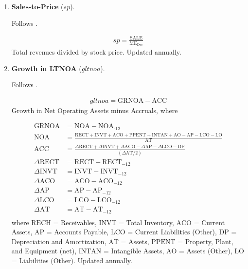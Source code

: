\begin{enumerate}
	
	
	\item \textbf{Sales-to-Price} ($sp$).
	
	
	Follows . 
	
	\begin{align*}
		sp =\frac{ \mathrm{SALE} }{ \mathrm{ME}_{\text{Dec}} }
	\end{align*}
	Total revenues divided by stock price. Updated annually.
	
	
	
	\item \textbf{Growth in LTNOA} ($gltnoa$). 
	
	Follows . 
	
	\begin{align*}
		gltnoa = \mathrm{GRNOA} - \mathrm{ACC}
	\end{align*}
	Growth in Net Operating Assets minus Accruals, where 
	
	\begin{align*}
		\mathrm{GRNOA} &= \mathrm{NOA} - \mathrm{NOA}_{\text{-12}} \\
		\mathrm{NOA} &= \frac{ \mathrm{RECT} + \mathrm{INVT} + \mathrm{ACO} + \mathrm{PPENT} + \mathrm{INTAN} + \mathrm{AO} - \mathrm{AP} - \mathrm{LCO} - \mathrm{LO} }{ \mathrm{AT} } \\
		\mathrm{ACC} &= \frac{ \Delta\mathrm{RECT} + \Delta\mathrm{INVT} + \Delta\mathrm{ACO} - \Delta\mathrm{AP} - \Delta\mathrm{LCO} - \mathrm{DP} }{ \left( \Delta\mathrm{AT} / 2 \right) } \\
		\Delta\mathrm{RECT} &= \mathrm{RECT} - \mathrm{RECT}_{-12} \\
		\Delta\mathrm{INVT} &= \mathrm{INVT} - \mathrm{INVT}_{-12} \\
		\Delta\mathrm{ACO} &= \mathrm{ACO} - \mathrm{ACO}_{-12} \\
		\Delta\mathrm{AP} &= \mathrm{AP} - \mathrm{AP}_{-12} \\
		\Delta\mathrm{LCO} &= \mathrm{LCO} - \mathrm{LCO}_{-12} \\
		\Delta\mathrm{AT} &= \mathrm{AT} - \mathrm{AT}_{-12} \\
	\end{align*}
	where $\mathrm{RECH}$ = Receivables, $\mathrm{INVT}$ = Total Inventory, $\mathrm{ACO}$ = Current Assets, $\mathrm{AP}$ = Accounts Payable, $\mathrm{LCO}$ =  Current Liabilities (Other), $\mathrm{DP}$ = Depreciation and Amortization, $\mathrm{AT}$ = Assets, $\mathrm{PPENT}$ = Property, Plant, and Equipment (net), $\mathrm{INTAN}$ = Intangible Assets, $\mathrm{AO}$ = Assets (Other), $\mathrm{LO}$ = Liabilities (Other). Updated annually.
	

\end{enumerate}
